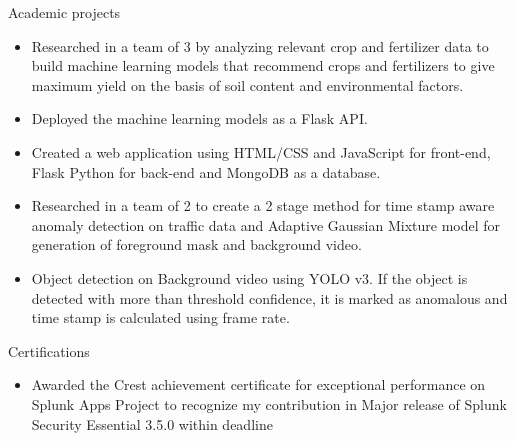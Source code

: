\documentclass{resume} %
\begin{document}
        \begin{workSection}{Academic projects}
            
                \customItem[
                    title=Crop and Fertilizer Recommendation Engine,
                    organization=University of Windsor,
                    duration=2022
                ]
                
                \begin{itemize}
                    \itemsep -6pt {}\item Researched in a team of 3 by analyzing relevant crop and fertilizer data to build machine learning models that recommend crops and fertilizers to give maximum yield on the basis of soil content and environmental factors.\item Deployed the machine learning models as a Flask API.\item Created a web application using HTML/CSS and JavaScript for front-end, Flask Python for back-end and MongoDB as a database.
                \end{itemize}
            
                \customItem[
                    title=Anomaly detection on Traffic data,
                    organization=Nirma University,
                    duration=2020
                ]
                
                \begin{itemize}
                    \itemsep -6pt {}\item Researched in a team of 2 to create a 2 stage method for time stamp aware anomaly detection on traffic data and Adaptive Gaussian Mixture model for generation of foreground mask and background video. \item Object detection on Background video using YOLO v3. If the object is detected with more than threshold confidence, it is marked as anomalous and time stamp is calculated using frame rate.
                \end{itemize}
             

        \end{workSection}  
        \begin{workSection}  {Certifications}
            
                    \customItem[
                        title=Crest Achievement Certificate,
                        organization=Crest Data Systems,
                        duration=2022
                    ]
                    
                    \begin{itemize}
                        \itemsep -6pt {}\item Awarded the Crest achievement certificate for exceptional performance on Splunk Apps Project to recognize my contribution in Major release of Splunk Security Essential 3.5.0 within deadline
                    \end{itemize}
                
            
        \end{workSection}

        
\end{document}
